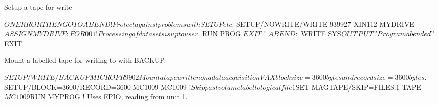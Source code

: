 \begin{XMP}
Setup a tape for write

$ ON ERROR THEN GOTO ABEND        ! Protect against problems with SETUP etc.
$ SETUP/NOWRITE/WRITE 939927 XIN112 MYDRIVE
$ ASSIGN MYDRIVE:  FOR001         ! Processing of data sets is up to user.
$ RUN PROG
$ EXIT
$ !
$ABEND:
$ WRITE SYS$OUTPUT "Program abended"
$ EXIT

Mount a labelled tape for writing to with BACKUP.

$SETUP/WRITE/BACKUP MICRO PR9902

Mount a tape written on a data acquisition VAX
blocksize = 3600 bytes and recordsize = 3600 bytes.

$SETUP/BLOCK=3600/RECORD=3600 MC1009 MC1009
$! Skip past volume label to logical file 1
$SET MAGTAPE/SKIP=FILES:1 TAPE$MC1009
$RUN MYPROG ! Uses EPIO, reading from unit 1.
\end{XMP}
